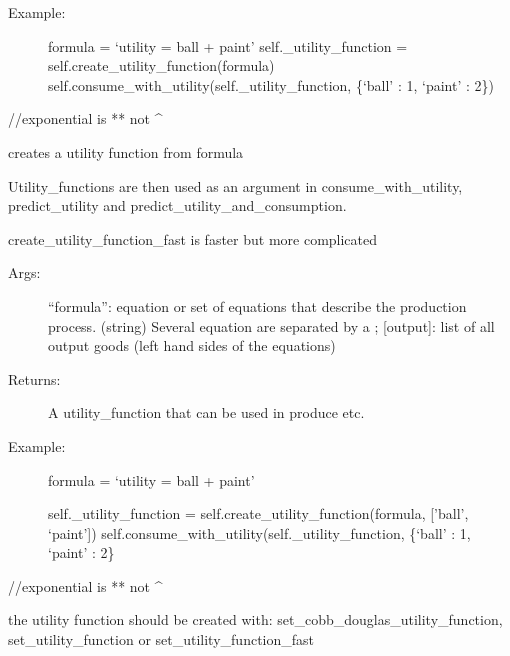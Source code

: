 \documentclass[letterpaper,10pt,english]{sphinxmanual}
\begin{document}
\begin{fulllineitems}
\begin{fulllineitems}
\begin{description}
\item[{Example:}] \leavevmode
formula = `utility = ball + paint'
self.\_utility\_function = self.create\_utility\_function(formula)
self.consume\_with\_utility(self.\_utility\_function, \{`ball' : 1, `paint' : 2\})

\end{description}

//exponential is ** not \textasciicircum{}

\end{fulllineitems}


\begin{fulllineitems}
\label{Household:abce.Household.set_utility_function_fast}
creates a utility function from formula

Utility\_functions are then used as an argument in consume\_with\_utility,
predict\_utility and predict\_utility\_and\_consumption.

create\_utility\_function\_fast is faster but more complicated
\begin{description}
\item[{Args:}] \leavevmode
``formula'': equation or set of equations that describe the
production process. (string) Several equation are separated by a ;
{[}output{]}: list of all output goods (left hand sides of the equations)

\item[{Returns:}] \leavevmode
A utility\_function that can be used in produce etc.

\item[{Example:}] \leavevmode
formula = `utility = ball + paint'

self.\_utility\_function = self.create\_utility\_function(formula, {[}'ball', `paint'{]})
self.consume\_with\_utility(self.\_utility\_function, \{`ball' : 1, `paint' : 2\}

\end{description}

//exponential is ** not \textasciicircum{}

\end{fulllineitems}


\begin{fulllineitems}
\label{Household:abce.Household.utility_function}
the utility function should be created with:
set\_cobb\_douglas\_utility\_function,
set\_utility\_function or
set\_utility\_function\_fast

\end{fulllineitems}


\end{fulllineitems}
\end{document}
